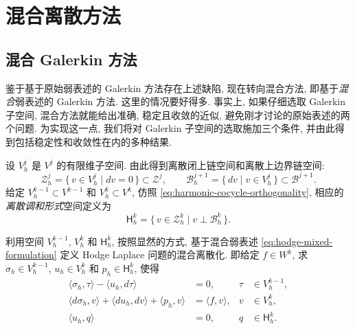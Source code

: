 \section{{混合离散方法}}\label{sec:mixed-methods}

\subsection{{混合 Galerkin 方法}}\label{subsec:mixed-galerkin}

{鉴于基于原始弱表述的 Galerkin 方法存在上述缺陷, 现在转向混合方法, 即基于\emph{混合}弱表述的 Galerkin 方法. 这里的情况要好得多. 事实上, 如果仔细选取 Galerkin 子空间, 混合方法就能给出准确, 稳定且收敛的近似, 避免刚才讨论的原始表述的两个问题. 为实现这一点, 我们将对 Galerkin 子空间的选取施加三个条件, 并由此得到包括稳定性和收敛性在内的多种结果.}

{设 $V_h^j$ 是 $V^j$ 的有限维子空间. 由此得到离散闭上链空间和离散上边界链空间:}
\[
\mathcal Z_h^j=\{\,v\in V_h^j\mid dv=0\,\}\subset\mathcal Z^j,\qquad\mathcal B_h^{j+1}=\{\,dv\mid v\in V_h^j\,\}\subset\mathcal B^{j+1}.
\]
{给定 $V_h^{k-1}\subset V^{k-1}$ 和 $V_h^k\subset V^k$, 仿照 \eqref{eq:harmonic-cocycle-orthogonality}, 相应的\emph{离散调和形式}空间定义为}
\[
\mathsf H_h^k=\{\,v\in\mathcal Z_h^k\mid v\perp\mathcal B_h^k\,\}.
\]

{利用空间 $V_h^{k-1}$, $V_h^k$ 和 $\mathsf H_h^k$, 按照显然的方式, 基于混合弱表述 \eqref{eq:hodge-mixed-formulation} 定义 Hodge Laplace 问题的混合离散化. 即给定 $f\in W^k$, 求 $\sigma_h\in V_h^{k-1}$, $u_h\in V_h^k$ 和 $p_h\in\mathsf H_h^k$, 使得}
\begin{equation}\label{eq:mixed-discrete-formulation}
\begin{aligned}
\langle\sigma_h,\tau\rangle-\langle u_h,d\tau\rangle&=0,&\tau&\in V_h^{k-1},\\
\langle d\sigma_h,v\rangle+\langle du_h,dv\rangle+\langle p_h,v\rangle&=\langle f,v\rangle,&v&\in V_h^k,\\
\langle u_h,q\rangle&=0,&q&\in\mathsf H_h^k.
\end{aligned}
\end{equation}

